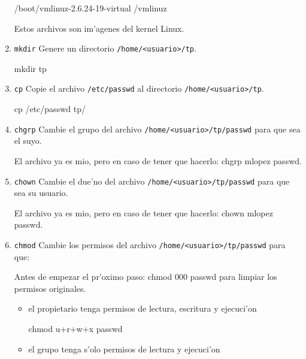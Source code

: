 \begin{enumerate}
\begin{lastTwo}
/boot/vmlinuz-2.6.24-19-virtual
/vmlinuz
\end{lastTwo}

Estos archivos son im'agenes del kernel Linux.

\item \texttt{mkdir} Genere un directorio \texttt{/home/<usuario>/tp}.

\begin{lastTwo}
mkdir tp
\end{lastTwo}

\item \texttt{cp} Copie el archivo \texttt{/etc/passwd} al directorio \texttt{/home/<usuario>/tp}.

\begin{lastTwo}
cp /etc/passwd tp/
\end{lastTwo}

\item \texttt{chgrp} Cambie el grupo del archivo \texttt{/home/<usuario>/tp/passwd} para que sea el suyo.

\begin{lastTwo}
El archivo ya es mio, pero en caso de tener que hacerlo: chgrp mlopez passwd.
\end{lastTwo}

\item \texttt{chown} Cambie el due'no del archivo \texttt{/home/<usuario>/tp/passwd} para que sea su usuario.

\begin{lastTwo}
El archivo ya es mio, pero en caso de tener que hacerlo: chown mlopez passwd.
\end{lastTwo}

\item \texttt{chmod} Cambie los permisos del archivo \texttt{/home/<usuario>/tp/passwd} para que:

\begin{lastTwo}
Antes de empezar el pr'oximo paso: chmod 000 passwd para limpiar los permisos originales.
\end{lastTwo}
\begin{itemize}
\item el propietario tenga permisos de lectura, escritura y ejecuci'on

\begin{lastTwo}
chmod u+r+w+x passwd
\end{lastTwo}

\item el grupo tenga s'olo permisos de lectura y ejecuci'on


\end{itemize}
\end{enumerate}
